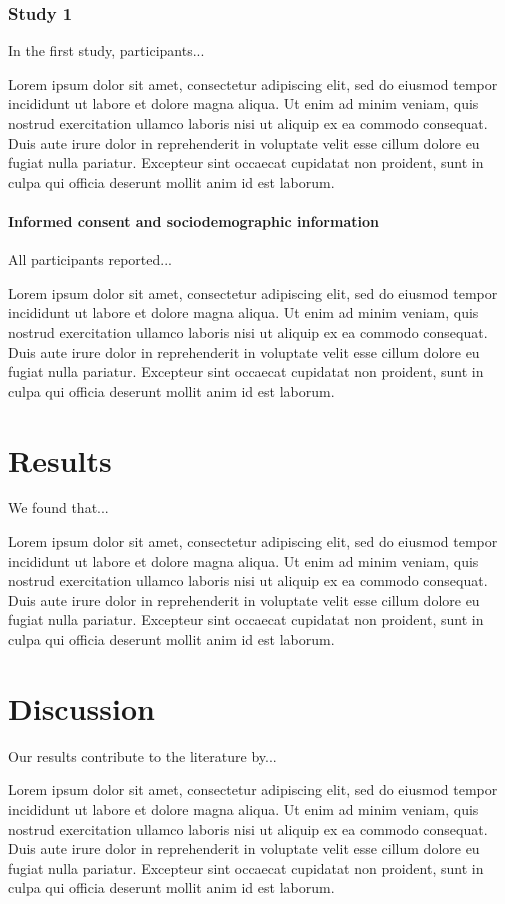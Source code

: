 \documentclass[jou, floatsintext, colorlinks=true, linkcolor=blue, citecolor=blue, urlcolor=blue]{apa7} %
\begin{document}
\subsubsection{Study 1}

In the first study, participants...

Lorem ipsum dolor sit amet, consectetur adipiscing elit, sed do eiusmod tempor incididunt ut labore et dolore magna aliqua. Ut enim ad minim veniam, quis nostrud exercitation ullamco laboris nisi ut aliquip ex ea commodo consequat. Duis aute irure dolor in reprehenderit in voluptate velit esse cillum dolore eu fugiat nulla pariatur. Excepteur sint occaecat cupidatat non proident, sunt in culpa qui officia deserunt mollit anim id est laborum.

\paragraph{Informed consent and sociodemographic information}

All participants reported...

Lorem ipsum dolor sit amet, consectetur adipiscing elit, sed do eiusmod tempor incididunt ut labore et dolore magna aliqua. Ut enim ad minim veniam, quis nostrud exercitation ullamco laboris nisi ut aliquip ex ea commodo consequat. Duis aute irure dolor in reprehenderit in voluptate velit esse cillum dolore eu fugiat nulla pariatur. Excepteur sint occaecat cupidatat non proident, sunt in culpa qui officia deserunt mollit anim id est laborum.

\section{Results}

We found that...

Lorem ipsum dolor sit amet, consectetur adipiscing elit, sed do eiusmod tempor incididunt ut labore et dolore magna aliqua. Ut enim ad minim veniam, quis nostrud exercitation ullamco laboris nisi ut aliquip ex ea commodo consequat. Duis aute irure dolor in reprehenderit in voluptate velit esse cillum dolore eu fugiat nulla pariatur. Excepteur sint occaecat cupidatat non proident, sunt in culpa qui officia deserunt mollit anim id est laborum.

\section{Discussion}

Our results contribute to the literature by...

Lorem ipsum dolor sit amet, consectetur adipiscing elit, sed do eiusmod tempor incididunt ut labore et dolore magna aliqua. Ut enim ad minim veniam, quis nostrud exercitation ullamco laboris nisi ut aliquip ex ea commodo consequat. Duis aute irure dolor in reprehenderit in voluptate velit esse cillum dolore eu fugiat nulla pariatur. Excepteur sint occaecat cupidatat non proident, sunt in culpa qui officia deserunt mollit anim id est laborum.

\printbibliography %
\end{document}
